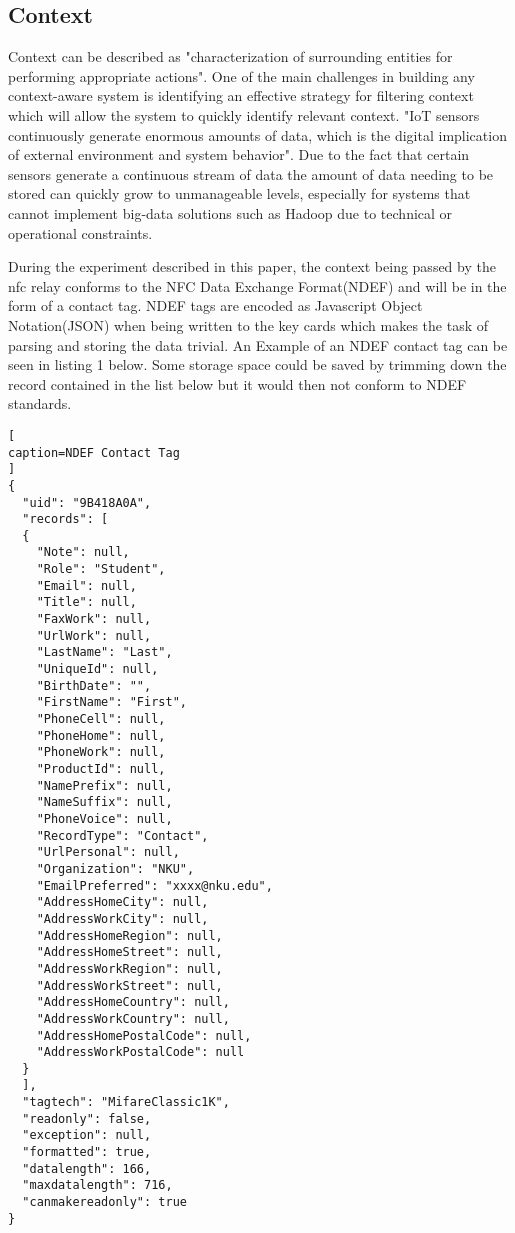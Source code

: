 \documentclass[11pt,journal]{IEEEtran}
\begin{document}
\subsection{Context}
Context can be described as "characterization of surrounding entities for performing appropriate actions".\cite{mahalle2013identity} One of the main challenges in building any context-aware system is identifying an effective strategy for filtering context which will allow the system to quickly identify relevant context.  "IoT sensors continuously generate enormous amounts of data, which is the digital implication of external environment and system behavior".\cite{Song:2018:TIC:3180374.3181341}  Due to the fact that certain sensors generate a continuous stream of data the amount of data needing to be stored can quickly grow to unmanageable levels, especially for systems that cannot implement big-data solutions such as Hadoop due to technical or operational constraints.

During the experiment described in this paper, the context being passed by the nfc relay conforms to the NFC Data Exchange Format(NDEF) and will be in the form of a contact tag. NDEF tags are encoded as Javascript Object Notation(JSON) when being written to the key cards which makes the task of parsing and storing the data trivial. An Example of an NDEF contact tag can be seen in listing 1 below.  Some storage space could be saved by trimming down the record contained in the list below but it would then not conform to NDEF standards.

\begin{lstlisting}[
caption=NDEF Contact Tag
]
{
  "uid": "9B418A0A",
  "records": [
  {
    "Note": null,
	"Role": "Student",
	"Email": null,
	"Title": null,
	"FaxWork": null,
	"UrlWork": null,
	"LastName": "Last",
	"UniqueId": null,
	"BirthDate": "",
	"FirstName": "First",
	"PhoneCell": null,
	"PhoneHome": null,
	"PhoneWork": null,
	"ProductId": null,
	"NamePrefix": null,
	"NameSuffix": null,
	"PhoneVoice": null,
	"RecordType": "Contact",
	"UrlPersonal": null,
	"Organization": "NKU",
	"EmailPreferred": "xxxx@nku.edu",
	"AddressHomeCity": null,
	"AddressWorkCity": null,
	"AddressHomeRegion": null,
	"AddressHomeStreet": null,
	"AddressWorkRegion": null,
	"AddressWorkStreet": null,
	"AddressHomeCountry": null,
	"AddressWorkCountry": null,
	"AddressHomePostalCode": null,
	"AddressWorkPostalCode": null
  }
  ],
  "tagtech": "MifareClassic1K",
  "readonly": false,
  "exception": null,
  "formatted": true,
  "datalength": 166,
  "maxdatalength": 716,
  "canmakereadonly": true
}
\end{lstlisting}
\end{document}
